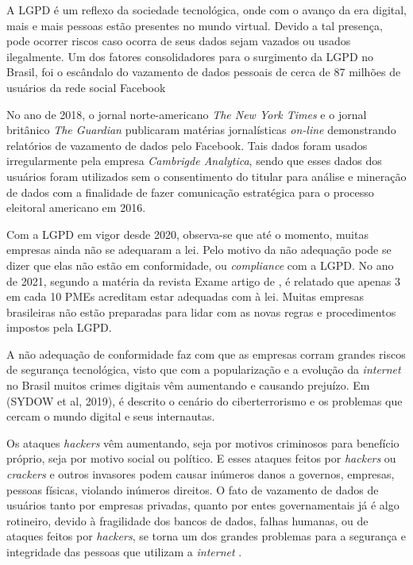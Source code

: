 \documentclass[
	12pt,				%
	openright,			%
	oneside,			%
	a4paper,			%
	english,			%
	french,				%
	spanish,			%
	brazil,				%
	]{abntex2}
\begin{document}
A LGPD é um reflexo da sociedade tecnológica, onde com o avanço da era digital, mais e mais pessoas estão presentes no mundo virtual. Devido a tal presença, pode ocorrer riscos caso ocorra de seus dados sejam vazados ou usados ilegalmente. Um dos fatores consolidadores para o surgimento da LGPD no Brasil, foi o escândalo do vazamento de dados pessoais de cerca de 87 milhões de usuários da rede social Facebook \cite{01-02-olhardigital}

No ano de 2018, o jornal norte-americano \textit{The New York Times} \cite{01-03-newYorkTimes}  e o jornal britânico \textit{The Guardian} \cite{01-04-theGuardian}  publicaram matérias jornalísticas \textit{on-line} demonstrando relatórios de vazamento de dados pelo Facebook. Tais dados foram usados irregularmente pela empresa \textit{Cambrigde Analytica}, sendo que esses dados dos usuários foram utilizados sem o consentimento do titular para análise e mineração de dados com a finalidade de fazer comunicação estratégica para o processo eleitoral americano em 2016. 

Com a LGPD em vigor desde 2020, observa-se que até o momento, muitas empresas ainda não se adequaram a lei. Pelo motivo da não adequação pode se dizer que elas não estão em conformidade, ou \textit{compliance} com a LGPD.  No ano de 2021, segundo a matéria da revista Exame artigo de \cite{01-05-revistaExame} , é relatado que apenas 3 em cada 10 PMEs acreditam estar adequadas com à lei. Muitas empresas brasileiras não estão preparadas para lidar com as novas regras e procedimentos impostos pela LGPD.

A não adequação de conformidade faz com que as empresas corram grandes riscos de segurança tecnológica, visto que com a popularização e a evolução da \textit{internet} no Brasil muitos crimes digitais vêm aumentando e causando prejuízo. Em (SYDOW et al, 2019), é descrito o cenário do ciberterrorismo e os problemas que cercam o mundo digital e seus internautas. 

Os ataques \textit{hackers} vêm aumentando, seja por motivos criminosos para benefício próprio, seja por motivo social ou político. E esses ataques feitos por \textit{hackers} ou \textit{crackers} e outros invasores podem causar inúmeros danos a governos, empresas, pessoas físicas, violando inúmeros direitos. O fato de vazamento de dados de usuários tanto por empresas privadas, quanto por entes governamentais já é algo rotineiro, devido à fragilidade dos bancos de dados, falhas humanas, ou de ataques feitos por\textit{ hackers}, se torna um dos grandes problemas para a segurança e integridade das pessoas que utilizam a \textit{internet} \cite{01-07-revistaExame2} .
\end{document}
